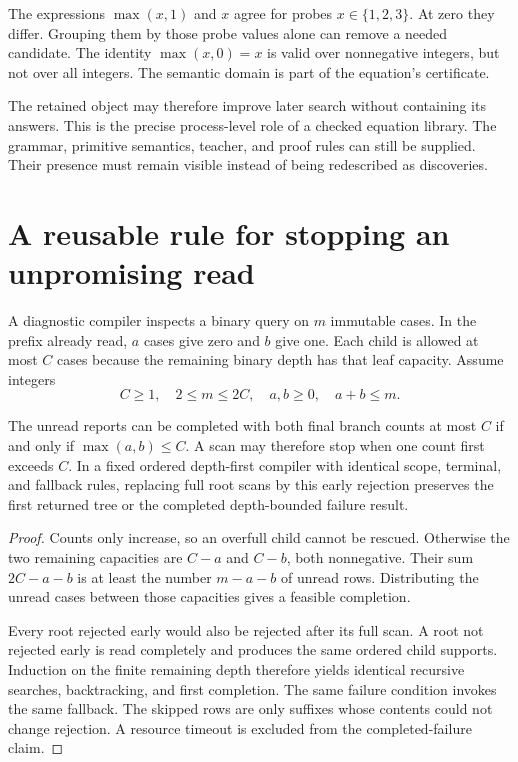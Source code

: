 \begin{counterexample}\label{ce:probe}
The expressions $\max(x,1)$ and $x$ agree for probes $x\in\{1,2,3\}$. At zero they differ. Grouping them by those probe values alone can remove a needed candidate. The identity $\max(x,0)=x$ is valid over nonnegative integers, but not over all integers. The semantic domain is part of the equation's certificate.
\end{counterexample}

The retained object may therefore improve later search without containing its answers. This is the precise process-level role of a checked equation library. The grammar, primitive semantics, teacher, and proof rules can still be supplied. Their presence must remain visible instead of being redescribed as discoveries.

\section{A reusable rule for stopping an unpromising read}
A diagnostic compiler inspects a binary query on $m$ immutable cases. In the prefix already read, $a$ cases give zero and $b$ give one. Each child is allowed at most $C$ cases because the remaining binary depth has that leaf capacity. Assume integers
\[
C\ge1,\quad 2\le m\le2C,\quad a,b\ge0,\quad a+b\le m.
\]

\begin{proposition}\label{r:prefix}
The unread reports can be completed with both final branch counts at most $C$ if and only if $\max(a,b)\le C$. A scan may therefore stop when one count first exceeds $C$. In a fixed ordered depth-first compiler with identical scope, terminal, and fallback rules, replacing full root scans by this early rejection preserves the first returned tree or the completed depth-bounded failure result.
\end{proposition}
\begin{proof}
Counts only increase, so an overfull child cannot be rescued. Otherwise the two remaining capacities are $C-a$ and $C-b$, both nonnegative. Their sum $2C-a-b$ is at least the number $m-a-b$ of unread rows. Distributing the unread cases between those capacities gives a feasible completion.

Every root rejected early would also be rejected after its full scan. A root not rejected early is read completely and produces the same ordered child supports. Induction on the finite remaining depth therefore yields identical recursive searches, backtracking, and first completion. The same failure condition invokes the same fallback. The skipped rows are only suffixes whose contents could not change rejection. A resource timeout is excluded from the completed-failure claim.
\end{proof}


